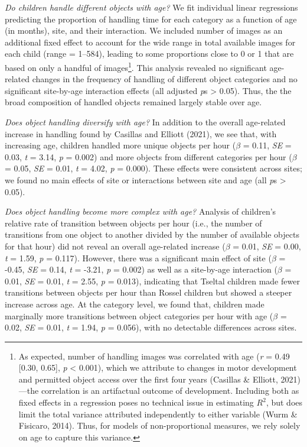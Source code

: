 \documentclass[10pt, letterpaper]{article}
\begin{document}
\emph{Do children handle different objects with age?} We fit individual
linear regressions predicting the proportion of handling time for each
category as a function of age (in months), site, and their interaction.
We included number of images as an additional fixed effect to account
for the wide range in total available images for each child (range =
1--584), leading to some proportions close to 0 or 1 that are based on
only a handful of images\footnote{As expected, number of handling images
  was correlated with age (\emph{r} = 0.49 {[}0.30, 0.65{]}, \emph{p}
  \textless{} 0.001), which we attribute to changes in motor development
  and permitted object access over the first four years (Casillas \&
  Elliott, 2021)---the correlation is an artifactual outcome of
  development. Including both as fixed effects in a regression poses no
  technical issue in estimating \(R^{2}\), but does limit the total
  variance attributed independently to either variable (Wurm \&
  Fisicaro, 2014). Thus, for models of non-proportional measures, we
  rely solely on age to capture this variance.}. This analysis revealed
no significant age-related changes in the frequency of handling of
different object categories and no significant site-by-age interaction
effects (all adjusted \emph{p}s \textgreater{} 0.05). Thus, the the
broad composition of handled objects remained largely stable over age.

\emph{Does object handling diversify with age?} In addition to the
overall age-related increase in handling found by Casillas and Elliott
(2021), we see that, with increasing age, children handled more unique
objects per hour (\(\beta\) = 0.11, \emph{SE} = 0.03, \emph{t} = 3.14,
\emph{p} = 0.002) and more objects from different categories per hour
(\(\beta\) = 0.05, \emph{SE} = 0.01, \emph{t} = 4.02, \emph{p} = 0.000).
These effects were consistent across sites; we found no main effects of
site or interactions between site and age (all \emph{p}s \textgreater{}
0.05).

\emph{Does object handling become more complex with age?} Analysis of
children's relative rate of transition between objects per hour (i.e.,
the number of transitions from one object to another divided by the
number of available objects for that hour) did not reveal an overall
age-related increase (\(\beta\) = 0.01, \emph{SE} = 0.00, \emph{t} =
1.59, \emph{p} = 0.117). However, there was a significant main effect of
site (\(\beta\) = -0.45, \emph{SE} = 0.14, \emph{t} = -3.21, \emph{p} =
0.002) as well as a site-by-age interaction (\(\beta\) = 0.01, \emph{SE}
= 0.01, \emph{t} = 2.55, \emph{p} = 0.013), indicating that Tseltal
children made fewer transitions between objects per hour than Rossel
children but showed a steeper increase across age. At the category
level, we found that, children made marginally more transitions between
object categories per hour with age (\(\beta\) = 0.02, \emph{SE} = 0.01,
\emph{t} = 1.94, \emph{p} = 0.056), with no detectable differences
across sites.
\end{document}

